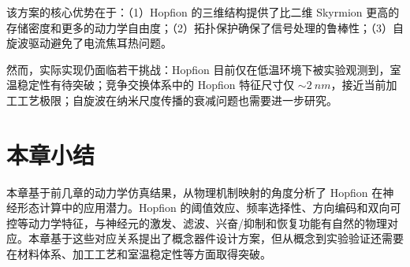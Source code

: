 该方案的核心优势在于：（1）Hopfion 的三维结构提供了比二维 Skyrmion 更高的存储密度和更多的动力学自由度；（2）拓扑保护确保了信号处理的鲁棒性；（3）自旋波驱动避免了电流焦耳热问题。

然而，实际实现仍面临若干挑战：Hopfion 目前仅在低温环境下被实验观测到\cite{zheng2023hopfion}，室温稳定性有待突破；竞争交换体系中的 Hopfion 特征尺寸仅 $\sim\SI{2}{nm}$，接近当前加工工艺极限；自旋波在纳米尺度传播的衰减问题也需要进一步研究。


\section{本章小结}

本章基于前几章的动力学仿真结果，从物理机制映射的角度分析了 Hopfion 在神经形态计算中的应用潜力。Hopfion 的阈值效应、频率选择性、方向编码和双向可控等动力学特征，与神经元的激发、滤波、兴奋/抑制和恢复功能有自然的物理对应。本章基于这些对应关系提出了概念器件设计方案，但从概念到实验验证还需要在材料体系、加工工艺和室温稳定性等方面取得突破。
